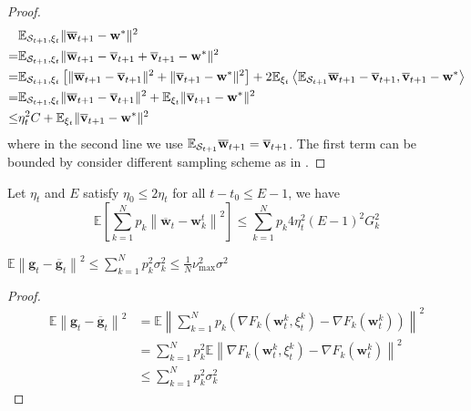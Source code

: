 \begin{proof}
\begin{align*}
& \EE_{\cS_{t+1}, \xi_{t}} \|\overline{\vw}_{t+1} - \vw^*\|^2 \\
=& \EE_{\cS_{t+1}, \xi_{t}} \|\overline{\vw}_{t+1} - \overline{\vv}_{t+1} + \overline{\vv}_{t+1} - \vw^*\|^2\\
=& \EE_{\cS_{t+1}, \xi_{t}} \left[\|\overline{\vw}_{t+1} - \overline{\vv}_{t+1}\|^2 + \|\overline{\vv}_{t+1} - \vw^*\|^2\right] + 2\EE_{\xi_{t}} \left<\EE_{\cS_{t+1}} \overline{\vw}_{t+1} - \overline{\vv}_{t+1},   \overline{\vv}_{t+1} - \vw^*\right> \\
=& \EE_{\cS_{t+1}, \xi_{t}} \|\overline{\vw}_{t+1} - \overline{\vv}_{t+1}\|^2 + \EE_{\xi_t} \|\overline{\vv}_{t+1} - \vw^*\|^2 \\
\leq&  \eta_t^2 C + \EE_{\xi_t} \|\overline{\vv}_{t+1} - \vw^*\|^2 %
\end{align*}
where in the second line we use $\mathbb{E}_{{\mathcal{S}}_{t+1}} \overline{{\mathbf{w}}}_{t+1}  = \overline{{\mathbf{v}}}_{t+1}$. 
The first term can be bounded by consider different sampling scheme as in \eq{\ref{eq:partialsample}}.
\end{proof}

\begin{lemma}
Let $\eta_t$ and $E$ satisfy $\eta_0 \leq 2 \eta_t$ for all $t- t_0 \leq E - 1$, we have
$$\mathbb{E}\left[\sum_{k=1}^{N} p_{k}\left\|\overline{\mathbf{w}}_{t}-\mathbf{w}_{k}^{t}\right\|^{2}\right] \leq \sum_{k=1}^N p_k4 \eta_{t}^{2}(E-1)^{2} G_k^{2}$$
\label{lma:l3iclr}
\end{lemma}

\begin{lemma}
$\mathbb{E}\left\|\mathbf{g}_{t}-\overline{\mathbf{g}}_{t}\right\|^{2} \leq \sum_{k=1}^{N} p_{k}^{2}\sigma_k^2 \leq \frac{1}{N}\nu_{\max}^2\sigma^2$
\label{lma:iclrvar}
\end{lemma}
\begin{proof}
	\begin{align} 
\mathbb{E}\left\|\mathbf{g}_{t}-\overline{\mathbf{g}}_{t}\right\|^{2} &=\mathbb{E}\left\|\sum_{k=1}^{N} p_{k}\left(\nabla F_{k}\left(\mathbf{w}_{t}^{k}, \xi_{t}^{k}\right)-\nabla F_{k}\left(\mathbf{w}_{t}^{k}\right)\right)\right\|^{2} \\ &=\sum_{k=1}^{N} p_{k}^{2} \mathbb{E}\left\|\nabla F_{k}\left(\mathbf{w}_{t}^{k}, \xi_{t}^{k}\right)-\nabla F_{k}\left(\mathbf{w}_{t}^{k}\right)\right\|^{2} \\ & \leq \sum_{k=1}^{N} p_{k}^{2} \sigma_{k}^{2} \end{align}
\end{proof}


